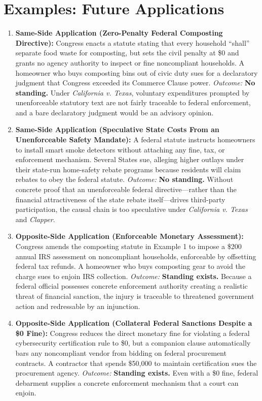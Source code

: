 \documentclass[12pt]{article}
\begin{document}
\section{Examples: Future Applications}

\begin{enumerate}
  \item \textbf{Same-Side Application (Zero-Penalty Federal Composting Directive):} Congress enacts a statute stating that every household ``shall'' separate food waste for composting, but sets the civil penalty at \$0 and grants no agency authority to inspect or fine noncompliant households. A homeowner who buys composting bins out of civic duty sues for a declaratory judgment that Congress exceeded its Commerce Clause power. \textit{Outcome:} \textbf{No standing.} Under \textit{California v. Texas}, voluntary expenditures prompted by unenforceable statutory text are not fairly traceable to federal enforcement, and a bare declaratory judgment would be an advisory opinion.
  \item \textbf{Same-Side Application (Speculative State Costs From an Unenforceable Safety Mandate):} A federal statute instructs homeowners to install smart smoke detectors without attaching any fine, tax, or enforcement mechanism. Several States sue, alleging higher outlays under their state-run home-safety rebate programs because residents will claim rebates to obey the federal statute. \textit{Outcome:} \textbf{No standing.} Without concrete proof that an unenforceable federal directive---rather than the financial attractiveness of the state rebate itself---drives third-party participation, the causal chain is too speculative under \textit{California v. Texas} and \textit{Clapper}.
  \item \textbf{Opposite-Side Application (Enforceable Monetary Assessment):} Congress amends the composting statute in Example 1 to impose a \$200 annual IRS assessment on noncompliant households, enforceable by offsetting federal tax refunds. A homeowner who buys composting gear to avoid the charge sues to enjoin IRS collection. \textit{Outcome:} \textbf{Standing exists.} Because a federal official possesses concrete enforcement authority creating a realistic threat of financial sanction, the injury is traceable to threatened government action and redressable by an injunction.
  \item \textbf{Opposite-Side Application (Collateral Federal Sanctions Despite a \$0 Fine):} Congress reduces the direct monetary fine for violating a federal cybersecurity certification rule to \$0, but a companion clause automatically bars any noncompliant vendor from bidding on federal procurement contracts. A contractor that spends \$50,000 to maintain certification sues the procurement agency. \textit{Outcome:} \textbf{Standing exists.} Even with a \$0 fine, federal debarment supplies a concrete enforcement mechanism that a court can enjoin.

\end{enumerate}
\end{document}
